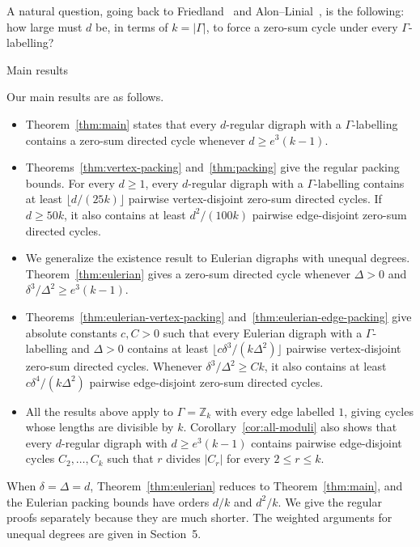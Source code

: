 \documentclass[11pt]{amsart}
\makeatletter
\def\subsection{\@startsection{subsection}{2}%
  \z@{1.05\linespacing\@plus.5\linespacing}{.4\linespacing}%
  {\normalfont\large\bfseries\raggedright}}
\theoremstyle{remark}
\makeatother
\begin{document}
A natural question, going back to Friedland~\cite{Friedland} and
Alon--Linial~\cite{AlonLinial}, is the following: how large must $d$ be,
in terms of $k=|\Gamma|$, to force a zero-sum cycle under every
$\Gamma$-labelling?

\subsection{Main results}

Our main results are as follows.
\begin{itemize}
\item Theorem~\ref{thm:main} states that every $d$-regular digraph with
a $\Gamma$-labelling contains a zero-sum directed cycle whenever
$d\ge e^3(k-1)$.

\item Theorems~\ref{thm:vertex-packing} and~\ref{thm:packing} give the
regular packing bounds.  For every $d\ge1$, every $d$-regular digraph
with a $\Gamma$-labelling contains at least
$\lfloor d/(25k)\rfloor$ pairwise vertex-disjoint zero-sum directed
cycles.  If $d\ge50k$, it also contains at least $d^2/(100k)$ pairwise
edge-disjoint zero-sum directed cycles.

\item We generalize the existence result to Eulerian digraphs with
unequal degrees.  Theorem~\ref{thm:eulerian} gives a zero-sum directed
cycle whenever $\Delta>0$ and $\delta^3/\Delta^2\ge e^3(k-1)$.

\item Theorems~\ref{thm:eulerian-vertex-packing}
and~\ref{thm:eulerian-edge-packing} give absolute constants $c,C>0$
such that every Eulerian digraph with a $\Gamma$-labelling and $\Delta>0$
contains at least $\lfloor c\delta^3/(k\Delta^2)\rfloor$ pairwise
vertex-disjoint zero-sum directed cycles.  Whenever
$\delta^3/\Delta^2\ge Ck$, it also contains at least
$c\delta^4/(k\Delta^2)$ pairwise edge-disjoint zero-sum directed
cycles.

\item All the results above apply to $\Gamma=\mathbb Z_k$ with every
edge labelled $1$, giving cycles whose lengths are divisible by $k$.
Corollary~\ref{cor:all-moduli} also shows that every $d$-regular digraph
with $d\ge e^3(k-1)$ contains pairwise edge-disjoint cycles
$C_2,\ldots,C_k$ such that $r$ divides $|C_r|$ for every $2\le r\le k$.
\end{itemize}

When $\delta=\Delta=d$, Theorem~\ref{thm:eulerian} reduces to
Theorem~\ref{thm:main}, and the Eulerian packing bounds have orders
$d/k$ and $d^2/k$.  We give the regular proofs separately because they
are much shorter.  The weighted arguments
for unequal degrees are given in Section~5.
\end{document}
